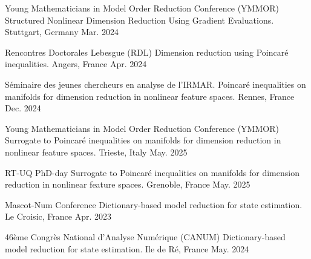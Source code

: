 \begin{cvpresentations}
\cvpresentation
{Young Mathematicians in Model Order Reduction Conference (YMMOR)} %
{Structured Nonlinear Dimension Reduction Using Gradient Evaluations.} %
{Stuttgart, Germany} %
{Mar. 2024} %


\cvpresentation
{Rencontres Doctorales Lebesgue (RDL)} %
{Dimension reduction using Poincaré inequalities.} %
{Angers, France} %
{Apr. 2024} %


\cvpresentation
{S\'eminaire des jeunes chercheurs en analyse de l'IRMAR.} %
{Poincaré inequalities on manifolds for dimension reduction in nonlinear feature spaces.} %
{Rennes, France} %
{Dec. 2024} %


\cvpresentation
{Young Mathematicians in Model Order Reduction Conference (YMMOR)} %
{Surrogate to Poincaré inequalities on manifolds for dimension reduction in nonlinear feature spaces.} %
{Trieste, Italy} %
{May. 2025} %


\cvpresentation
{RT-UQ PhD-day} %
{Surrogate to Poincaré inequalities on manifolds for dimension reduction in nonlinear feature spaces.} %
{Grenoble, France} %
{May. 2025} %


\end{cvpresentations}


\begin{cvpresentations}


\cvpresentation
{Mascot-Num Conference} %
{Dictionary-based model reduction for state estimation.} %
{Le Croisic, France} %
{Apr. 2023} %


\cvpresentation
{46\`eme Congr\`es National d'Analyse Num\'erique (CANUM)} %
{Dictionary-based model reduction for state estimation.} %
{Ile de Ré, France} %
{May. 2024} %


\end{cvpresentations}